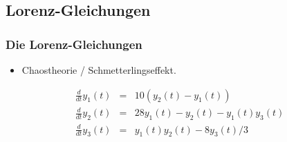 \documentclass[hyperref={xetex}]{beamer}
\begin{document}
\subsection{Lorenz-Gleichungen}
%
%
\begin{frame}[fragile]\frametitle{Die Lorenz-Gleichungen}
\begin{itemize}
 \item Chaostheorie / Schmetterlingseffekt.
\end{itemize}

\begin{eqnarray*}
\frac{d}{dt} y_1(t) & = & 10 (y_2(t) -y_1(t)) \\
\frac{d}{dt} y_2(t) & = & 28 y_1(t) -y_2(t) -y_1(t)y_3(t)\\ 
\frac{d}{dt} y_3(t) & = & y_1(t)y_2(t) -8y_3(t)/3
\end{eqnarray*}


\end{frame}
\end{document}
